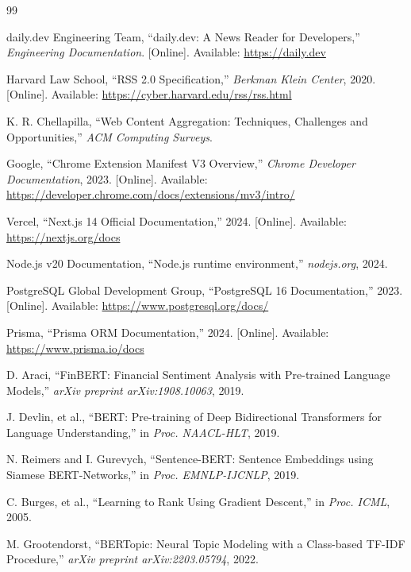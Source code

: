 \documentclass[conference]{IEEEtran}
\begin{document}
\begin{thebibliography}{99}

daily.dev Engineering Team, ``daily.dev: A News Reader for Developers,'' \textit{Engineering Documentation}. [Online]. Available: \url{https://daily.dev}

Harvard Law School, ``RSS 2.0 Specification,'' \textit{Berkman Klein Center}, 2020. [Online]. Available: \url{https://cyber.harvard.edu/rss/rss.html}

K. R. Chellapilla, ``Web Content Aggregation: Techniques, Challenges and Opportunities,'' \textit{ACM Computing Surveys}.

Google, ``Chrome Extension Manifest V3 Overview,'' \textit{Chrome Developer Documentation}, 2023. [Online]. Available: \url{https://developer.chrome.com/docs/extensions/mv3/intro/}

Vercel, ``Next.js 14 Official Documentation,'' 2024. [Online]. Available: \url{https://nextjs.org/docs}

Node.js v20 Documentation, ``Node.js runtime environment,'' \textit{nodejs.org}, 2024.

PostgreSQL Global Development Group, ``PostgreSQL 16 Documentation,'' 2023. [Online]. Available: \url{https://www.postgresql.org/docs/}

Prisma, ``Prisma ORM Documentation,'' 2024. [Online]. Available: \url{https://www.prisma.io/docs}

D. Araci, ``FinBERT: Financial Sentiment Analysis with Pre-trained Language Models,'' \textit{arXiv preprint arXiv:1908.10063}, 2019.

J. Devlin, et al., ``BERT: Pre-training of Deep Bidirectional Transformers for Language Understanding,'' in \textit{Proc. NAACL-HLT}, 2019.

N. Reimers and I. Gurevych, ``Sentence-BERT: Sentence Embeddings using Siamese BERT-Networks,'' in \textit{Proc. EMNLP-IJCNLP}, 2019.

C. Burges, et al., ``Learning to Rank Using Gradient Descent,'' in \textit{Proc. ICML}, 2005.

M. Grootendorst, ``BERTopic: Neural Topic Modeling with a Class-based TF-IDF Procedure,'' \textit{arXiv preprint arXiv:2203.05794}, 2022.


\end{thebibliography}
\end{document}

